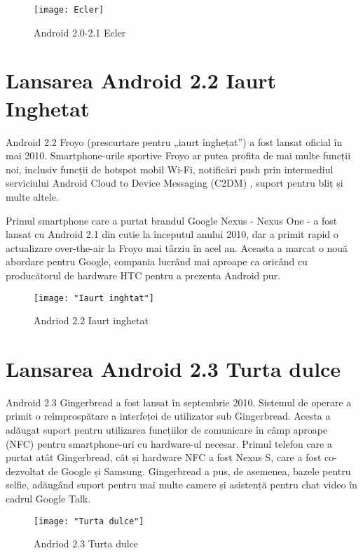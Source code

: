 \documentclass[a4paper,12pt]{amsbook}
\begin{document}
	\begin{figure}[h]
		\centering
		\texttt{[image: Ecler]}
		\caption[Ecler]{Android 2.0-2.1 Ecler}
		\label{fig:ecler}
	\end{figure}
 \par
\chapter{\Large Lansarea Android 2.2 Iaurt Inghetat }
\par
Android 2.2 Froyo (prescurtare pentru „iaurt înghețat”) a fost lansat oficial în mai 2010. Smartphone-urile sportive Froyo ar putea profita de mai multe funcții noi, inclusiv funcții de hotspot mobil Wi-Fi, notificări push prin intermediul serviciului Android Cloud to Device Messaging (C2DM) , suport pentru bliț și multe altele.

Primul smartphone care a purtat brandul Google Nexus - Nexus One - a fost lansat cu Android 2.1 din cutie la începutul anului 2010, dar a primit rapid o actualizare over-the-air la Froyo mai târziu în acel an. Aceasta a marcat o nouă abordare pentru Google, compania lucrând mai aproape ca oricând cu producătorul de hardware HTC pentru a prezenta Android pur.

\begin{figure}[h]
	\centering
	\texttt{[image: "Iaurt inghtat"]}
	\caption[Iaurt inghetat]{Andriod 2.2 Iaurt inghetat}
	\label{fig:iaurt-inghtat}
\end{figure}	
\par
	\chapter{\Large Lansarea Android 2.3 Turta dulce}
	\par
	Android 2.3 Gingerbread a fost lansat în septembrie 2010. Sistemul de operare a primit o reîmprospătare a interfeței de utilizator sub Gingerbread. Acesta a adăugat suport pentru utilizarea funcțiilor de comunicare în câmp aproape (NFC) pentru smartphone-uri cu hardware-ul necesar. Primul telefon care a purtat atât Gingerbread, cât și hardware NFC a fost Nexus S, care a fost co-dezvoltat de Google și Samsung. Gingerbread a pus, de asemenea, bazele pentru selfie, adăugând suport pentru mai multe camere și asistență pentru chat video în cadrul Google Talk.
	\begin{figure}[h]
		\centering
		\texttt{[image: "Turta dulce"]}
		\caption[Turta dulce]{Andriod 2.3 Turta dulce}
		\label{fig:turta-dulce}
	\end{figure}
\par
\end{document}
